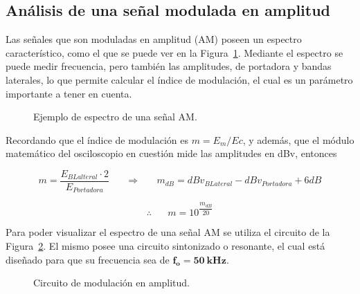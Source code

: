   \pagebreak
  \subsection{Análisis de una señal modulada en amplitud}
    Las señales que son moduladas en amplitud (AM) poseen un espectro característico, como el que se puede ver
    en la Figura~\ref{fig:EjemploEspectroModAM}. Mediante el espectro se puede medir frecuencia, pero también
    las amplitudes, de portadora y bandas laterales, lo que permite calcular el índice de modulación, el cual es
    un parámetro importante a tener en cuenta. 

    \begin{figure}[H]
      \centering
      \caption{Ejemplo de espectro de una señal AM.}
      \label{fig:EjemploEspectroModAM}
    \end{figure}

    Recordando que el índice de modulación es $m= E_m / Ec$, y además, que el módulo matemático del osciloscopio 
    en cuestión mide las amplitudes en dBv, entonces

    \begin{equation}
      m = \dfrac{E_{BLalteral} \cdot 2}{E_{Portadora}} \hspace{20pt}
      \Longrightarrow \hspace{20pt} m_{dB} = dBv_{BLateral} - dBv_{Portadora} + 6dB
      \label{eqn:IndiceModEndB}
    \end{equation}

    \begin{equation}
      \therefore \hspace{20pt} m=10^{\dfrac{m_{dB}}{20}}
      \label{eqn:IndiceMod}
    \end{equation}

    Para poder visualizar el espectro de una señal AM se utiliza el circuito de la Figura~\ref{fig:ModuladorAM}. 
    El mismo posee una circuito sintonizado o resonante, el cual está diseñado para que su
    frecuencia sea de $\mathbf{f_o = 50~kHz}$.

    \begin{figure}[H]
      \centering
      \caption{Circuito de modulación en amplitud.}
      \label{fig:ModuladorAM}
    \end{figure}

